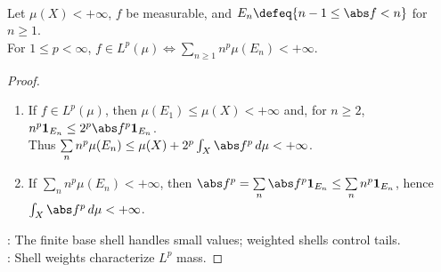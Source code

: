 \begin{proposition} \label{prop:lp-layer-shell-criterion-finite-measure} \\
Let $\mu(X)<+\infty$, $f$ be measurable, and $E_n\defeq\{n-1\leq\abs f<n\}$ for $n\geq1$.\\
For $1\leq p<\infty$, $f\in L^p(\mu)\iff\sum\limits_{n\geq1}n^p\mu(E_n)<+\infty$.
\begin{proof}
\begin{enumerate}[label=\roman*.]
\setlength{\itemsep}{0pt}
\item[$(\Rightarrow)$] If $f\in L^p(\mu)$, then $\mu(E_1)\leq\mu(X)<+\infty$ and, for $n\geq2$, $n^p\mathbf{1}_{E_n}\leq2^p\abs f^p\mathbf{1}_{E_n}$.\\
Thus $\sum\limits_n n^p\mu(E_n)\leq\mu(X)+2^p\int_X\abs f^p\,d\mu<+\infty$.
\item[$(\Leftarrow)$] If $\sum\limits_n n^p\mu(E_n)<+\infty$, then $\abs f^p=\sum\limits_n\abs f^p\mathbf{1}_{E_n}\leq\sum\limits_n n^p\mathbf{1}_{E_n}$, hence $\int_X\abs f^p\,d\mu<+\infty$.
\end{enumerate}
: The finite base shell handles small values; weighted shells control tails.\\
: Shell weights characterize $L^p$ mass.
\end{proof}
\end{proposition}

